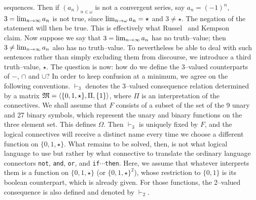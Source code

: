 sequences. Then if $(a_n)_{n \in \omega}$ is not a convergent
series, say $a_n = (-1)^n$, $3 = \lim_{n \rightarrow \infty} a_n$ is not
true, since $\lim_{n \rightarrow \omega} a_n = \star$ and $3 \neq \star$.
The negation of the statement will then be true. This is
effectively what Russel~ and
Kempson~ 
claim. Now suppose we say
that $3 = \lim_{n \rightarrow \infty} a_n$ has no truth--value; then $3
\neq \lim_{n \rightarrow \infty} a_n$ also has no truth--value. To
nevertheless be able to deal with such sentences rather than
simply excluding them from discourse, we introduce a third 
truth--value, $\star$. The question is now: how do we define the
3--valued counterparts of $-$, $\cap$ and $\cup$? In order to keep
confusion at a minimum, we agree on the following conventions.
$\vdash_3$ denotes the 3--valued consequence relation determined
by a matrix $\mathfrak{M} = \langle \{0,1,\star\}, \Pi, \{1\}\rangle$, where $\Pi$
is an interpretation of the connectives. We shall assume that $F$
consists of a subset of the set of the 9 unary and 27 binary
symbols, which represent the unary and binary functions on the
three element set. This defines $\Omega$. Then $\vdash_3$ is
uniquely fixed by $F$, and the logical connectives will receive a
distinct name every time we choose a different function on
$\{0,1,\star\}$. What remains to be solved, then, is not what
logical language to use but rather by what connective to translate
the ordinary language connectors {\tt not}, {\tt and}, {\tt or},
and {\tt if$\dotsb$then}. Here, we assume that whatever interprets
them is a function on $\{0,1,\star\}$ (or $\{0,1,\star\}^{2}$),
whose restriction to $\{0,1\}$ is its boolean counterpart, which
is already given. For those functions, the 2--valued consequence
is also defined and denoted by $\vdash_2$.

